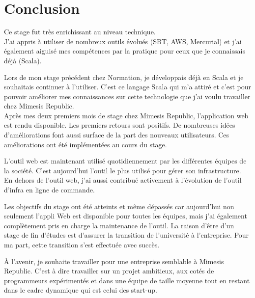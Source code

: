 \chapter{Conclusion}

Ce stage fut très enrichissant au niveau technique.\\
J'ai appris à utiliser de nombreux outils évolués (SBT, AWS, Mercurial)
et j'ai également aiguisé mes compétences par la pratique pour ceux que je
connaissais déjà (Scala).

Lors de mon stage précédent chez Normation, je développais déjà en Scala et je
souhaitais continuer à l'utiliser. C'est ce langage Scala qui m'a attiré et
c'est pour pouvoir améliorer mes connaissances sur cette technologie que j'ai
voulu travailler chez Mimesis Republic.\\

Après mes deux premiers mois de stage chez Mimesis Republic, l'application web
est rendu disponible.
Les premiers retours sont positifs. De nombreuses idées d'améliorations font
aussi surface de la part des nouveaux utilisateurs.
Ces améliorations ont été implémentées au cours du stage.

L'outil web est maintenant utilisé quotidiennement par les différentes équipes
de la société. C'est aujourd'hui l'outil le plus utilisé pour gérer son
infrastructure. En dehors de l'outil web, j'ai aussi contribué activement à
l'évolution de l'outil d'infra en ligne de commande.

Les objectifs du stage ont été atteints et même dépassés car aujourd'hui non
seulement l'appli Web est disponible pour toutes les équipes, mais j'ai
également complètement pris en charge la maintenance de l'outil. 
La raison d'être d'un stage de fin d'études est d'assurer la transition de
l'université à l'entreprise. Pour ma part, cette transition s'est effectuée avec
succès.

À l'avenir, je souhaite travailler pour une entreprise semblable à Mimesis
Republic. C'est à dire travailler sur un projet ambitieux, aux cotés de
programmeurs expérimentés et dans une équipe de taille moyenne tout en restant
dans le cadre dynamique qui est celui des start-up.



